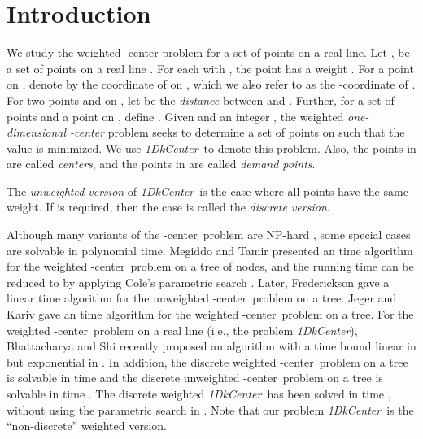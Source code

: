 \documentclass{llncs}
\def\cen{-center}
\def\problem{{\it 1DkCenter}}
\begin{document}
\section{Introduction}
\label{sec:intro}

We study the weighted -center problem for a set
of  points on a real line. Let ,  be a set
of  points on a real line . For each  with ,
the point  has a weight . For a point  on
, denote by  the coordinate of  on , which we also
refer to as the -coordinate of . For two points  and  on
, let  be the {\em distance} between  and
. Further, for a set  of
points and a point  on , define . Given  and an integer , the weighted
{\em one-dimensional -center} problem seeks to determine a set
 of  points on  such that the value
 is minimized. We
use \problem\ to denote this problem. Also, the points in  are
called {\em centers}, and the points in  are called
{\em demand points}.


The {\em unweighted version} of \problem\ is the case where all
points have the same weight. If  is required, then the
case is called the {\em discrete version}.




Although many variants of the \cen\ problem are NP-hard
\cite{ref:Ben-MosheAn06,ref:ChandrasekaranPo82,ref:FredericksonFi83,ref:KarivAn79,ref:MegiddoNe83}, some special cases are
solvable in polynomial time. Megiddo and Tamir
\cite{ref:MegiddoNe83} presented an  time
algorithm for the weighted \cen\ problem on a tree of  nodes, and
the running time can be reduced to  by applying Cole's
parametric search \cite{ref:ColeSl87}. Later, Frederickson
\cite{ref:FredericksonPa91} gave a linear time algorithm for the
unweighted \cen\ problem on a tree. Jeger and Kariv
\cite{ref:JegerAl85} gave an  time algorithm for the
weighted \cen\ problem on a tree. For the weighted \cen\ problem on
a real line (i.e., the problem \problem), Bhattacharya and Shi
\cite{ref:BhattacharyaOp07} recently proposed an algorithm with a
time bound linear in  but exponential in .
In addition, the discrete weighted \cen\ problem on a tree is solvable in
 time \cite{ref:MegiddoAn81} and the discrete
unweighted \cen\ problem on a tree is solvable in  time
\cite{ref:FredericksonPa91}.
The discrete weighted \problem\ has been solved in
 time \cite{ref:MegiddoAn81}, without using the parametric search in \cite{ref:ColeSl87}.
Note that our problem \problem\ is the
``non-discrete'' weighted version.
\end{document}
